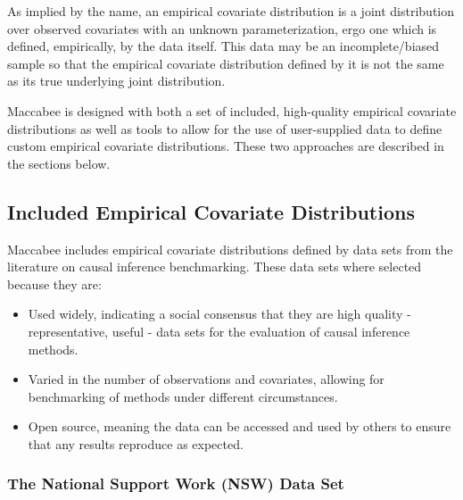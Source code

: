 \documentclass[../main.tex]{subfiles}
\begin{document}
\vspace{\baselineskip}

As implied by the name, an empirical covariate distribution is a joint distribution over observed covariates with an unknown parameterization, ergo one which is defined, empirically, by the data itself. This data may be an incomplete/biased sample so that the empirical covariate distribution defined by it is not the same as its true underlying joint distribution.

\vspace{\baselineskip}

Maccabee is designed with both a set of included, high-quality empirical covariate distributions as well as tools to allow for the use of user-supplied data to define custom empirical covariate distributions. These two approaches are described in the sections below.

\subsection{Included Empirical Covariate Distributions}

Maccabee includes empirical covariate distributions defined by data sets from the literature on causal inference benchmarking. These data sets where selected because they are:

\begin{itemize}
    \item Used widely, indicating a social consensus that they are high quality - representative, useful - data sets for the evaluation of causal inference methods.

    \item Varied in the number of observations and covariates, allowing for benchmarking of methods under different circumstances.

    \item Open source, meaning the data can be accessed and used by others to ensure that any results reproduce as expected.
\end{itemize}

\subsubsection{The National Support Work (NSW) Data Set}
\end{document}

